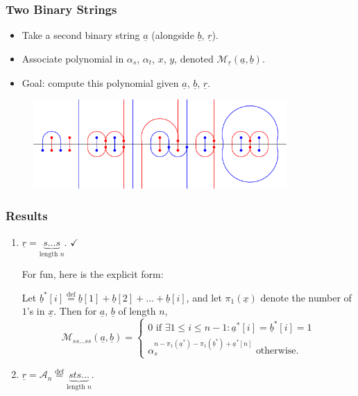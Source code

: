 \documentclass[pdf]{beamer}
\def\ii{\item}
\def\ul#1{\underline{#1}}
\def\AA{\mathcal A}
\def\MM{\mathcal M}
\newcommand{\defeq}{\stackrel{\text{def}}{=}}
\begin{document}
\begin{frame}[fragile]
	\frametitle{Two Binary Strings}
	\begin{itemize}
		\ii Take a second binary string $\ul a$ (alongside $\ul b$, $\ul r$).
		\ii Associate polynomial in $\alpha_s$, $\alpha_t$, $x$, $y$, denoted $\boxed{\MM_{\ul r}(\ul a, \ul b)}$.
		\ii \alert{Goal}: compute this polynomial given $\ul a$, $\ul b$, $\ul r$.
	\end{itemize}
	\begin{figure}[ht]
		\centering\includegraphics[height=3.4cm]{anime/compose_example-3.pdf}
	\end{figure}
\end{frame}
\begin{frame}
	\frametitle{Results}
	\begin{enumerate}
	\ii $\ul r = \underbrace{s\dots s}_{\text{length $n$}}$. \pause $\checkmark$
	\pause \par For fun, here is the explicit form:
	\begin{theorem}
		Let $\ul b^\ast[i] \defeq \ul b[1] + \ul b[2] + \dots + \ul b[i]$, and let $\pi_1(\ul x)$ denote the number of $1$'s in $\ul x$.  Then for $\ul a$, $\ul b$ of length $n$,
		\[
		\MM_{ss\dots ss} \left( \ul a, \ul b \right)
		=
		\begin{cases}
			0 \text{ if } \exists 1 \le i \le n-1: \ul a^\ast[i] = \ul b^\ast[i] = 1 \\
			\alpha_s^{n - \pi_1(\ul a^\ast) - \pi_1(\ul b^\ast) + \ul a^\ast[n]} \text{ otherwise}.
		\end{cases}
		\]
	\end{theorem}
	\pause
	\ii $\ul r = \AA_n \defeq \underbrace{sts\dots}_{\text{length $n$}}$.
	\end{enumerate}
\end{frame}
\end{document}
